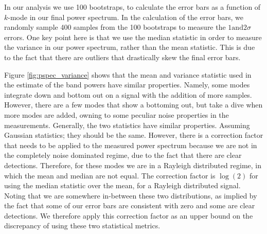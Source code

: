 \documentclass[twocolumn,numberedappendix]{emulateapj} \shorttitle{PSA64}
\begin{document}
In our analysis we use 100 bootstraps, to calculate the error bars as a function
of $k$-mode in our final power spectrum. In the calculation of the error bars,
we randomly sample 400 samples from the 100 bootstraps to measure the $1
\text{and} 2 \sigma$ errors. One key point here is that we use the median
statistic in order to measure the variance in our power spectrum, rather than
the mean statistic. This is due to the fact that there are outliers that
drastically skew the final error bars. 

Figure \ref{fig:pspec_variance} shows that the mean and variance statistic used
in the estimate of the band powers have similar properties. Namely, some modes
integrate down and bottom out on a signal with the addition of more samples.
However, there are a few modes that show a bottoming out, but take a dive when
more modes are added, owning to some peculiar noise properties in the
measurements. Generally, the two statistics have similar properties. Assuming
Gaussian statistics; they should be the same. However, there is a correction factor that needs to be applied to
the measured power spectrum because we are not in the completely noise dominated
regime, due to the fact that there are clear detections. Therefore, for these
modes we are in a Rayleigh distributed regime, in which the mean and median are
not equal. The correction factor is $\log{(2)}$ for using the
median statistic over the mean, for a Rayleigh distributed signal. Noting that
we are somewhere in-between these two distributions, as implied by the fact that 
some of our error bars are consistent with zero and some are clear detections.
We therefore apply this correction factor as an upper bound on the discrepancy
of using these two statistical metrics.
\end{document}
